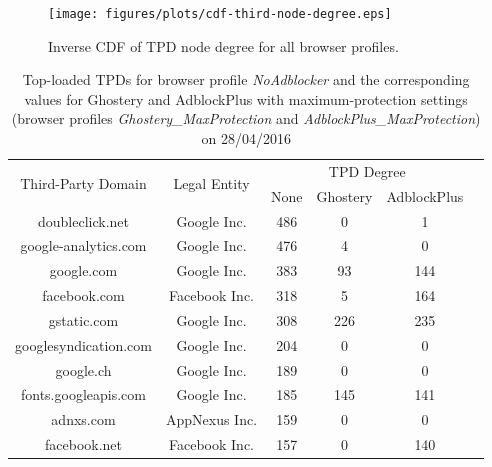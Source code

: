 \documentclass[compsoc, conference, letterpaper, 10pt, times]{IEEEtran}
\begin{document}
\begin{figure}
  \centering
  \texttt{[image: figures/plots/cdf-third-node-degree.eps]}
  \caption{Inverse CDF of TPD node degree for all browser profiles.}
  \label{fig:cdf_first_third_node_degree}
\end{figure}

  \begin{table}
  \centering
  \begin{tabular}{|c|c|c|c|c|c|}
  \hline
    \multirow{2}{*}{Third-Party Domain} & \multirow{2}{*}{Legal Entity} & \multicolumn{3}{|c|}{TPD Degree} \\
  \cline{3-5}
    & & \scriptsize{None} & \scriptsize{Ghostery} & \scriptsize{AdblockPlus} \\
  \hline
  doubleclick.net & Google Inc. & 486 & 0 & 1 \\
  google-analytics.com & Google Inc. & 476 & 4 & 0 \\
  google.com & Google Inc. & 383 & 93 & 144 \\
  facebook.com & Facebook Inc. & 318 & 5 & 164 \\
  gstatic.com & Google Inc. & 308 & 226 & 235 \\
  googlesyndication.com & Google Inc. & 204 & 0 & 0 \\
  google.ch & Google Inc. & 189 & 0 & 0 \\
  fonts.googleapis.com & Google Inc. & 185 & 145 & 141 \\
  adnxs.com & AppNexus Inc. & 159 & 0 & 0 \\
  facebook.net & Facebook Inc. & 157 & 0 & 140 \\
  \hline
  \end{tabular}
  \caption{Top-loaded TPDs for browser profile \textit{NoAdblocker} and the corresponding values for Ghostery and AdblockPlus with maximum-protection settings (browser profiles \textit{Ghostery\_MaxProtection} and \textit{AdblockPlus\_MaxProtection}) on 28/04/2016}
  \label{table:top_10_third_party_domains}
  \end{table}
\end{document}
